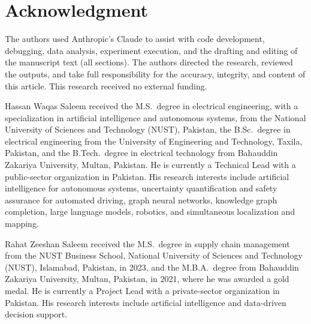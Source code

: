 \documentclass[lettersize,journal]{IEEEtran}
\begin{document}
\section*{Acknowledgment}
The authors used Anthropic's Claude to assist with code development, debugging, data analysis, experiment execution, and the
drafting and editing of the manuscript text (all sections). The authors directed the research, reviewed the outputs, and take
full responsibility for the accuracy, integrity, and content of this article. This research received no external funding.




\begin{IEEEbiographynophoto}{Hassan Waqas Saleem}
received the M.S.\ degree in electrical engineering, with a specialization in artificial intelligence and autonomous systems, from
the National University of Sciences and Technology (NUST), Pakistan, the B.Sc.\ degree in electrical engineering from the
University of Engineering and Technology, Taxila, Pakistan, and the B.Tech.\ degree in electrical technology from Bahauddin
Zakariya University, Multan, Pakistan. He is currently a Technical Lead with a public-sector organization in Pakistan. His
research interests include artificial intelligence for autonomous systems, uncertainty quantification and safety assurance for
automated driving, graph neural networks, knowledge graph completion, large language models, robotics, and simultaneous
localization and mapping.
\end{IEEEbiographynophoto}

\begin{IEEEbiographynophoto}{Rahat Zeeshan Saleem}
received the M.S.\ degree in supply chain management from the NUST Business School, National University of Sciences and
Technology (NUST), Islamabad, Pakistan, in 2023, and the M.B.A.\ degree from Bahauddin Zakariya University, Multan, Pakistan,
in 2021, where he was awarded a gold medal. He is currently a Project Lead with a private-sector organization in Pakistan. His
research interests include artificial intelligence and data-driven decision support.
\end{IEEEbiographynophoto}
\end{document}
